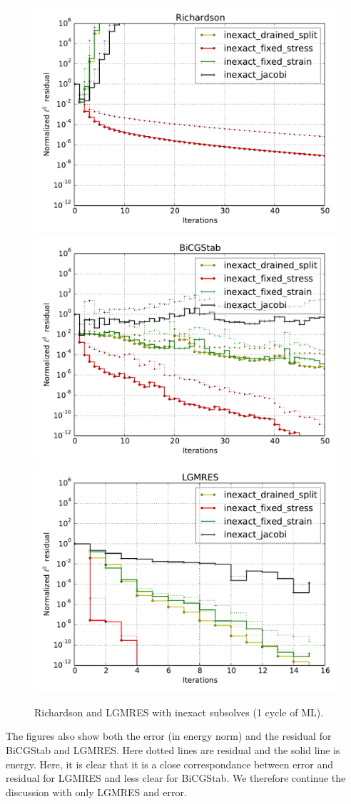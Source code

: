\documentclass{article}
\begin{document}
\begin{figure}
\begin{center}
\includegraphics[width=0.32\linewidth]{../Richardson,problem=2,exact=0,N=64.pdf}
\includegraphics[width=0.32\linewidth]{../BiCGStab,problem=2,exact=0,N=64.pdf}
\includegraphics[width=0.32\linewidth]{../LGMRES,problem=2,exact=0,N=64,cycles=1.pdf}
\caption{Richardson and LGMRES with inexact subsolves (1 cycle of ML).} 
\label{2dsc-richardson-lgmres-inexact}
\end{center}
\end{figure}


The figures also show both the error (in energy norm) and the residual for BiCGStab and LGMRES. 
Here dotted lines are residual and the solid line is energy. Here, it is clear that it is a
close correspondance between error and residual for LGMRES and less clear for BiCGStab. We therefore
continue the discussion with only LGMRES and error. 
\end{document}
